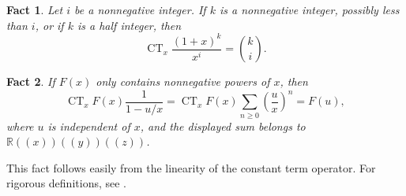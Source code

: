 \documentclass[reqno, 12pt]{article}
\theoremstyle{mydefinition}
\theoremstyle{myremark}
\newtheorem{Fact}{Fact}
\newcommand\CT{\mathop{\mathrm{CT}}}
\numberwithin{algorithm}{section}
\begin{document}
\begin{Fact}\label{Fact-one}
Let $i$ be a nonnegative integer. If $k$ is a nonnegative integer, possibly less than $i$, or if $k$ is a half integer, then
$$\mathop{\mathrm{CT}}_x \frac{(1+x)^k}{x^i}=
\binom{k}{i}.$$
\end{Fact}

\begin{Fact}\label{Fact-two}
If $F(x)$ only contains nonnegative powers of $x$, then
$$\CT_x  F(x)\frac{1}{1-u/x} =\CT_x F(x) \sum_{n\ge 0} \left(\frac{u}{x}\right)^n = F(u),$$
where $u$ is independent of $x$, and the displayed sum belongs to $\mathbb{R}((x))((y))((z))$.
\end{Fact}
This fact follows easily from the linearity of the constant term operator. For rigorous definitions, see \cite{Xin15}.
\end{document}
